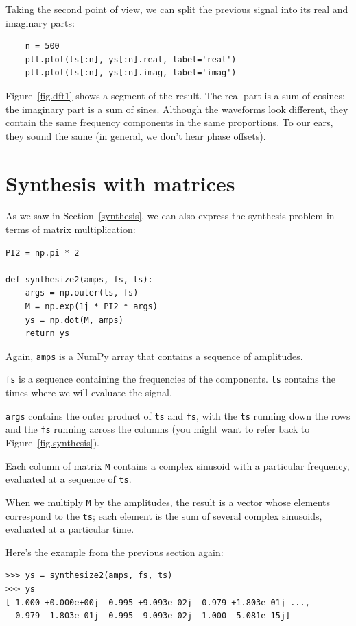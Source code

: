 \documentclass[12pt]{book}
\begin{document}
Taking the second point of view, we can split the previous
signal into its real and imaginary parts:

\begin{verbatim}
    n = 500
    plt.plot(ts[:n], ys[:n].real, label='real')
    plt.plot(ts[:n], ys[:n].imag, label='imag')
\end{verbatim}

Figure~\ref{fig.dft1} shows a segment of the result.  The
real part is a sum of cosines; the imaginary part is
a sum of sines.  Although the waveforms look different, they
contain the same frequency components in the same proportions.
To our ears, they sound the same (in general, we don't hear
phase offsets).


\section{Synthesis with matrices}
\label{synthmat}

As we saw in Section~\ref{synthesis}, we can also express the synthesis
problem in terms of matrix multiplication: 

\begin{verbatim}
PI2 = np.pi * 2

def synthesize2(amps, fs, ts):
    args = np.outer(ts, fs)
    M = np.exp(1j * PI2 * args)
    ys = np.dot(M, amps)
    return ys
\end{verbatim}

Again, {\tt amps} is a NumPy array that contains a sequence of
amplitudes.

{\tt fs} is a sequence containing the frequencies of the
components.  {\tt ts} contains the times where we will evaluate
the signal.

{\tt args} contains the outer product of {\tt ts} and {\tt fs},
with the {\tt ts} running down the rows and the {\tt fs} running
across the columns (you might want to refer back to
Figure~\ref{fig.synthesis}).

Each column of matrix {\tt M} contains a complex sinusoid with
a particular frequency, evaluated at a sequence of {\tt ts}.

When we multiply {\tt M} by the amplitudes, the result is a vector
whose elements correspond to the {\tt ts}; each element is the sum of
several complex sinusoids, evaluated at a particular time.

Here's the example from the previous section again:

\begin{verbatim}
>>> ys = synthesize2(amps, fs, ts)
>>> ys
[ 1.000 +0.000e+00j  0.995 +9.093e-02j  0.979 +1.803e-01j ...,
  0.979 -1.803e-01j  0.995 -9.093e-02j  1.000 -5.081e-15j]
\end{verbatim}
\end{document}
